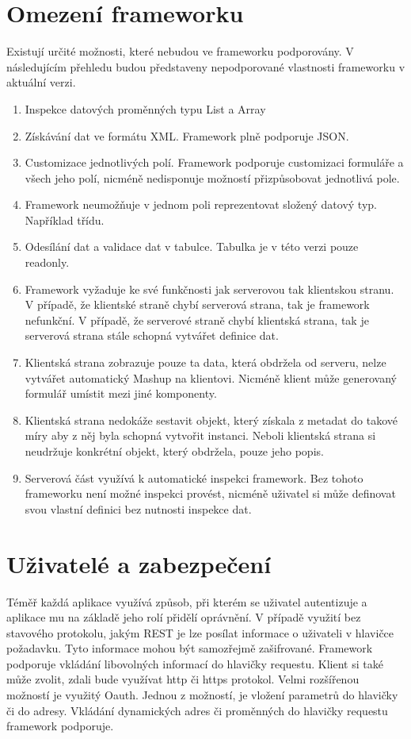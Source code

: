 \section{Omezení frameworku}
Existují určité možnosti, které nebudou ve frameworku podporovány. V následujícím přehledu budou představeny nepodporované vlastnosti frameworku v aktuální verzi.
\begin{enumerate}
\item Inspekce datových proměnných typu List a Array
\item Získávání dat ve formátu XML. Framework plně podporuje JSON.
\item Customizace jednotlivých polí. Framework podporuje customizaci formuláře a všech jeho polí, nicméně nedisponuje možností přizpůsobovat jednotlivá pole.
\item Framework neumožňuje v jednom poli reprezentovat složený datový typ. Například třídu.
\item Odesílání dat a validace dat v tabulce. Tabulka je v této verzi pouze readonly.
\item Framework vyžaduje ke své funkčnosti jak serverovou tak klientskou stranu. V případě, že klientské straně chybí serverová strana, tak je framework nefunkční. V případě, že serverové straně chybí klientská strana, tak je serverová strana stále schopná vytvářet definice dat.
\item Klientská strana zobrazuje pouze ta data, která obdržela od serveru, nelze vytvářet automatický Mashup na klientovi. Nicméně klient může generovaný formulář umístit mezi jiné komponenty.
\item Klientská strana nedokáže sestavit objekt, který získala z metadat do takové míry aby z něj byla schopná vytvořit instanci. Neboli klientská strana si neudržuje konkrétní objekt, který obdržela, pouze jeho popis.
\item Serverová část využívá k automatické inspekci framework. Bez tohoto frameworku není možné inspekci provést, nicméně uživatel si může definovat svou vlastní definici bez nutnosti inspekce dat.
\end{enumerate}

\section{Uživatelé a zabezpečení}
Téměř každá aplikace využívá způsob, při kterém se uživatel autentizuje a aplikace mu na základě jeho rolí přidělí oprávnění. V případě využití bez stavového protokolu, jakým REST je lze posílat informace o uživateli v hlavičce požadavku. Tyto informace mohou být samozřejmě zašifrované. Framework podporuje vkládání libovolných informací do hlavičky requestu. Klient si také může zvolit, zdali bude využívat http či https protokol. Velmi rozšířenou možností je využitý Oauth. Jednou z možností, je vložení parametrů do hlavičky či do adresy. Vkládání dynamických adres či proměnných do hlavičky requestu framework podporuje. 

